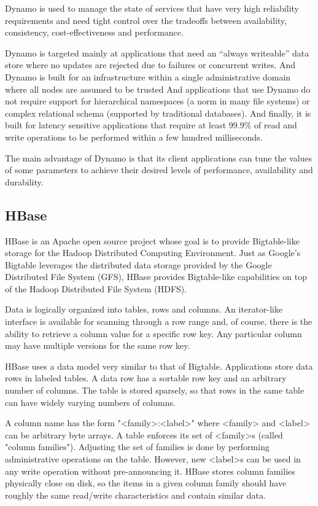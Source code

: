 \documentclass[a4paper]{article}
\begin{document}
Dynamo is used to manage the state of services that have very
high reliability requirements and need tight control over the
tradeoffs between availability, consistency, cost-effectiveness and
performance. 

Dynamo is targeted mainly at applications that need an “always
writeable” data store where no updates are rejected due to failures or
concurrent writes. And Dynamo is built for an
infrastructure within a single administrative domain where all
nodes are assumed to be trusted
And applications that use
Dynamo do not require support for hierarchical namespaces (a
norm in many file systems) or complex relational schema
(supported by traditional databases). And finally, it is built for
latency sensitive applications that require at least 99.9\% of read
and write operations to be performed within a few hundred
milliseconds.

The main advantage of Dynamo is that its client applications can
tune the values of some parameters to achieve their desired levels of
performance, availability and durability. 

\subsection{HBase}
HBase is an Apache open source project whose goal is to provide
Bigtable-like storage for the Hadoop Distributed Computing
Environment. Just as Google's Bigtable leverages the distributed data
storage provided by the Google Distributed File System (GFS), HBase
provides Bigtable-like capabilities on top of the Hadoop Distributed
File System (HDFS). 

Data is logically organized into tables, rows and columns. An
iterator-like interface is available for scanning through a row range
and, of course, there is the ability to retrieve a column value for a
specific row key. Any particular column may have multiple versions for
the same row key. 

HBase uses a data model very similar to that of Bigtable. Applications
store data rows in labeled tables. A data row has a sortable row key
and an arbitrary number of columns. The table is stored sparsely, so
that rows in the same table can have widely varying numbers of
columns. 

A column name has the form "<family>:<label>" where <family> and
<label> can be arbitrary byte arrays. A table enforces its set of
<family>s (called "column families"). Adjusting the set of families is
done by performing administrative operations on the table. However,
new <label>s can be used in any write operation without pre-announcing
it. HBase stores column families physically close on disk, so the
items in a given column family should have roughly the same read/write
characteristics and contain similar data. 
\end{document}
